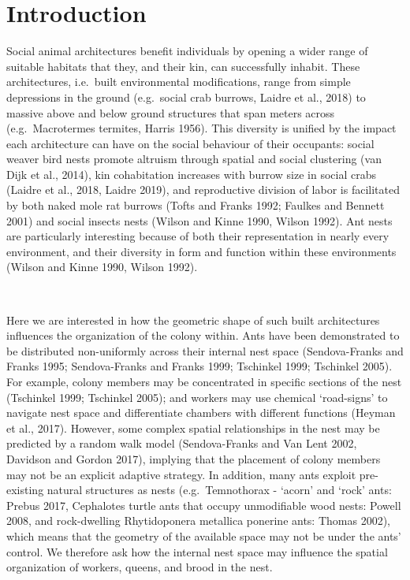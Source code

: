 \documentclass[3p]{elsarticle} %
\begin{document}
\newpage

\hypertarget{introduction}{%
\section{Introduction}\label{introduction}}

Social animal architectures benefit individuals by opening a wider range
of suitable habitats that they, and their kin, can successfully inhabit.
These architectures, i.e.~built environmental modifications, range from
simple depressions in the ground (e.g.~social crab burrows, Laidre et
al., 2018) to massive above and below ground structures that span meters
across (e.g.~Macrotermes termites, Harris 1956). This diversity is
unified by the impact each architecture can have on the social behaviour
of their occupants: social weaver bird nests promote altruism through
spatial and social clustering (van Dijk et al., 2014), kin cohabitation
increases with burrow size in social crabs (Laidre et al., 2018, Laidre
2019), and reproductive division of labor is facilitated by both naked
mole rat burrows (Tofts and Franks 1992; Faulkes and Bennett 2001) and
social insects nests (Wilson and Kinne 1990, Wilson 1992). Ant nests are
particularly interesting because of both their representation in nearly
every environment, and their diversity in form and function within these
environments (Wilson and Kinne 1990, Wilson 1992).

~

Here we are interested in how the geometric shape of such built
architectures influences the organization of the colony within. Ants
have been demonstrated to be distributed non-uniformly across their
internal nest space (Sendova-Franks and Franks 1995; Sendova-Franks and
Franks 1999; Tschinkel 1999; Tschinkel 2005). For example, colony
members may be concentrated in specific sections of the nest (Tschinkel
1999; Tschinkel 2005); and workers may use chemical `road-signs' to
navigate nest space and differentiate chambers with different functions
(Heyman et al., 2017). However, some complex spatial relationships in
the nest may be predicted by a random walk model (Sendova-Franks and Van
Lent 2002, Davidson and Gordon 2017), implying that the placement of
colony members may not be an explicit adaptive strategy. In addition,
many ants exploit pre-existing natural structures as nests
(e.g.~Temnothorax - `acorn' and `rock' ants: Prebus 2017, Cephalotes
turtle ants that occupy unmodifiable wood nests: Powell 2008, and
rock-dwelling Rhytidoponera metallica ponerine ants: Thomas 2002), which
means that the geometry of the available space may not be under the
ants' control. We therefore ask how the internal nest space may
influence the spatial organization of workers, queens, and brood in the
nest.
\end{document}
